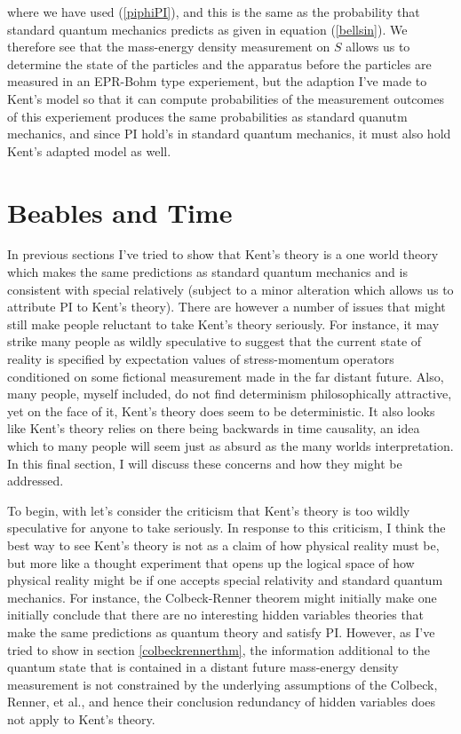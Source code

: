where we have used (\ref{piphiPI}), and this is the same as the probability that standard quantum mechanics predicts as given in equation (\ref{bellsin}). We therefore see that the mass-energy density measurement on $S$ allows us to determine the state of the particles and the apparatus before the particles are measured in an EPR-Bohm type experiement, but the adaption I've made to Kent's model so that it can compute probabilities of the measurement outcomes of this experiement produces the same probabilities as standard quanutm mechanics, and since PI hold's in standard quantum mechanics, it must also hold Kent's adapted model as well.\label{kentpiend}


\section{Beables and Time}
In previous sections I've tried to show that Kent's theory is a one world theory which makes the same predictions as standard quantum mechanics and is consistent with special relatively (subject to a minor alteration which allows us to attribute PI to Kent's theory). There are however a number of issues that might still make people reluctant to take Kent's theory seriously. For instance, it may strike many people as wildly speculative to suggest that the current state of reality is specified by expectation values of stress-momentum operators conditioned on some fictional measurement made in the far distant future. Also, many people, myself included, do not find determinism philosophically attractive, yet on the face of it, Kent's theory does seem to be deterministic. It also looks like Kent's theory relies on there being backwards in time causality, an idea which to many people will seem just as absurd as the many worlds interpretation. In this final section, I will discuss these concerns and how they might be addressed.

To begin, with let's consider the criticism that Kent's theory is too wildly speculative for anyone to take seriously. In response to this criticism, I think the best way to see Kent's theory is not as a claim of how physical reality must be, but more like a thought experiment that opens up the logical space of how physical reality might be if one accepts special relativity and standard quantum mechanics. For instance, the Colbeck-Renner theorem might initially make one initially conclude that there are no interesting hidden variables theories that make the same predictions as quantum theory and satisfy PI. However, as I've tried to show in section \ref{colbeckrennerthm}, the information additional to the quantum state that is contained in a distant future mass-energy density measurement is not constrained by the underlying assumptions of the Colbeck, Renner, et al., and hence their conclusion redundancy of hidden variables does not apply to Kent's theory. 

